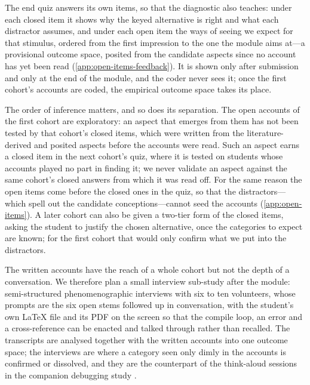 The end quiz answers its own items, so that the diagnostic also teaches:
under each closed item it shows why the keyed alternative is right and
what each distractor assumes, and under each open item the ways of seeing
we expect for that stimulus, ordered from the first impression to the one
the module aims at---a provisional outcome space, posited from the
candidate aspects since no account has yet been read
(\cref{app:open-items-feedback}).
It is shown only after submission and only at the end of the module, and
the coder never sees it; once the first cohort's accounts are coded, the
empirical outcome space takes its place.

The order of inference matters, and so does its separation.
The open accounts of the first cohort are exploratory: an aspect that
emerges from them has not been tested by that cohort's closed items,
which were written from the literature-derived and posited aspects before
the accounts were read.
Such an aspect earns a closed item in the next cohort's quiz, where it
is tested on students whose accounts played no part in finding it; we
never validate an aspect against the same cohort's closed answers from
which it was read off.
For the same reason the open items come before the closed ones in the
quiz, so that the distractors---which spell out the candidate
conceptions---cannot seed the accounts (\cref{app:open-items}).
A later cohort can also be given a two-tier form of the closed items,
asking the student to justify the chosen alternative, once the categories
to expect are known; for the first cohort that would only confirm what
we put into the distractors.

The written accounts have the reach of a whole cohort but not the depth
of a conversation.
We therefore plan a small interview sub-study after the module:
semi-structured phenomenographic interviews with six to ten volunteers,
whose prompts are the six open stems followed up in conversation, with
the student's own LaTeX file and its PDF on the screen so that the
compile loop, an error and a cross-reference can be enacted and talked
through rather than recalled.
The transcripts are analysed together with the written accounts into one
outcome space; the interviews are where a category seen only dimly in the
accounts is confirmed or dissolved, and they are the counterpart of the
think-aloud sessions in the companion debugging study \autocite{VTDebug}.

